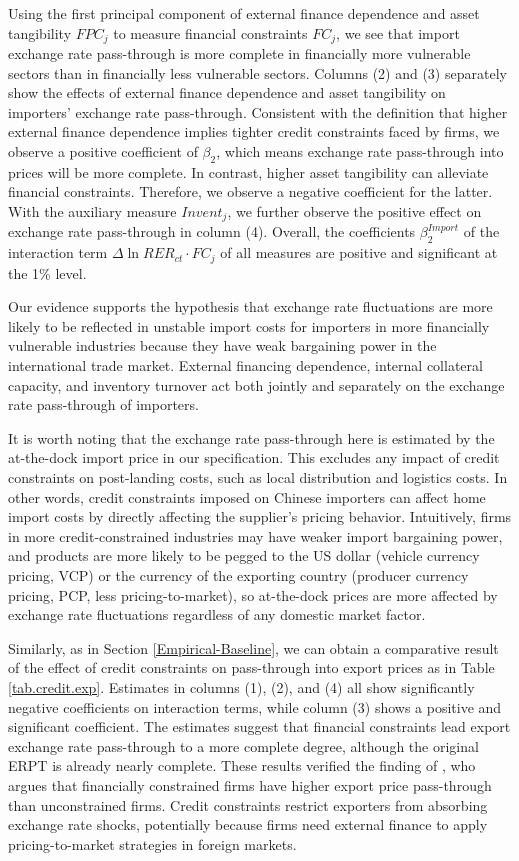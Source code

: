 \documentclass[12pt]{article}
\begin{document}
Using the first principal component of external finance dependence and asset tangibility $FPC_j$ to measure financial constraints $FC_j$, we see that import exchange rate pass-through is more complete in financially more vulnerable sectors than in financially less vulnerable sectors. Columns (2) and (3) separately show the effects of external finance dependence and asset tangibility on importers' exchange rate pass-through. Consistent with the definition that higher external finance dependence implies tighter credit constraints faced by firms, we observe a positive coefficient of $\beta_2$, which means exchange rate pass-through into prices will be more complete. In contrast, higher asset tangibility can alleviate financial constraints. Therefore, we observe a negative coefficient for the latter. With the auxiliary measure $Invent_j$, we further observe the positive effect on exchange rate pass-through in column (4). Overall, the coefficients $\beta^{Import}_2$ of the interaction term $\Delta \ln RER_{ct} \cdot FC_{j}$ of all measures are positive and significant at the 1\% level. 

Our evidence supports the hypothesis that exchange rate fluctuations are more likely to be reflected in unstable import costs for importers in more financially vulnerable industries because they have weak bargaining power in the international trade market. External financing dependence, internal collateral capacity, and inventory turnover act both jointly and separately on the exchange rate pass-through of importers.

It is worth noting that the exchange rate pass-through here is estimated by the at-the-dock import price in our specification. This excludes any impact of credit constraints on post-landing costs, such as local distribution and logistics costs. In other words, credit constraints imposed on Chinese importers can affect home import costs by directly affecting the supplier's pricing behavior. Intuitively, firms in more credit-constrained industries may have weaker import bargaining power, and products are more likely to be pegged to the US dollar (vehicle currency pricing, VCP) or the currency of the exporting country (producer currency pricing, PCP, less pricing-to-market), so at-the-dock prices are more affected by exchange rate fluctuations regardless of any domestic market factor.

Similarly, as in Section \ref{Empirical-Baseline}, we can obtain a comparative result of the effect of credit constraints on pass-through into export prices as in Table \ref{tab.credit.exp}. Estimates in columns (1), (2), and (4) all show significantly negative coefficients on interaction terms, while column (3) shows a positive and significant coefficient. The estimates suggest that financial constraints lead export exchange rate pass-through to a more complete degree, although the original ERPT is already nearly complete. These results verified the finding of \cite{strasser2013}, who argues that financially constrained firms have higher export price pass-through than unconstrained firms. Credit constraints restrict exporters from absorbing exchange rate shocks, potentially because firms need external finance to apply pricing-to-market strategies in foreign markets.
\end{document}
